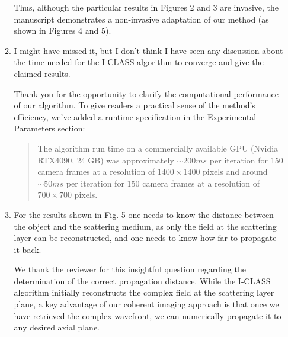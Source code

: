 \documentclass[12pt]{article}
\newenvironment{solved_reviewercomment}
    {\begin{tcolorbox}[width=\linewidth,colback=gray!5,colframe=solved_commentcolor!50,title=Reviewer Comment,left=5pt,right=5pt]}
    {\end{tcolorbox}}
\newenvironment{ourresponse}
    {\begin{tcolorbox}[width=\linewidth,breakable,enhanced,colback=gray!5,colframe=responsecolor!50,title=Response,left=5pt,right=5pt]}
    {\end{tcolorbox}}
\begin{document}
\begin{enumerate}[label=\arabic*.]
\begin{enumerate}[label=3.\alph*.]
\begin{ourresponse}
            Thus, although the particular results in Figures 2 and 3 are invasive, the manuscript demonstrates a non-invasive adaptation of our method (as shown in Figures 4 and 5).
        \end{ourresponse}
        
        \item \leavevmode\vspace{-\baselineskip}
        \begin{solved_reviewercomment}
            I might have missed it, but I don't think I have seen any discussion about the time needed for the I-CLASS algorithm to converge and give the claimed results.
        \end{solved_reviewercomment}
        \begin{ourresponse}
            Thank you for the opportunity to clarify the computational performance of our algorithm. To give readers a practical sense of the method's efficiency, we've added a runtime specification in the Experimental Parameters section:
            
            \begin{quote}
                The algorithm run time on a commercially available GPU (Nvidia RTX4090, 24 GB) was approximately $\sim 200ms$ per iteration for 150 camera frames at a resolution of $1400 \times 1400$ pixels and around $\sim 50ms$ per iteration for 150 camera frames at a resolution of $700 \times 700$ pixels.
            \end{quote}
        \end{ourresponse}
            
            

        
        \item \leavevmode\vspace{-\baselineskip}
        \begin{solved_reviewercomment}
            For the results shown in Fig. 5 one needs to know the distance between the object and the scattering medium, as only the field at the scattering layer can be reconstructed, and one needs to know how far to propagate it back.
        \end{solved_reviewercomment}

        \begin{ourresponse}
            We thank the reviewer for this insightful question regarding the determination of the correct propagation distance. While the I-CLASS algorithm initially reconstructs the complex field at the scattering layer plane, a key advantage of our coherent imaging approach is that once we have retrieved the complex wavefront, we can numerically propagate it to any desired axial plane.
            

\end{ourresponse}
\end{enumerate}
\end{enumerate}
\end{document}
